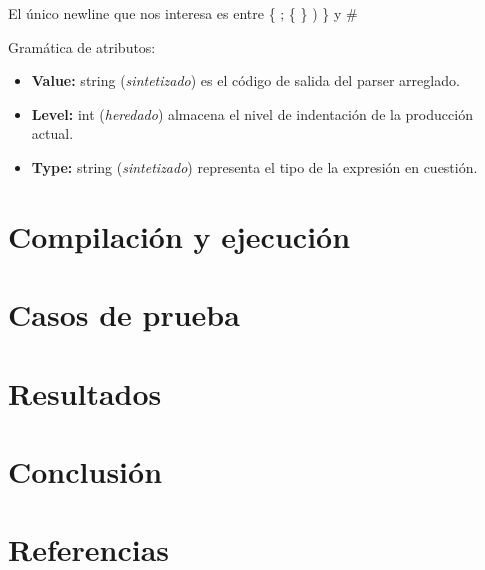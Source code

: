 \documentclass[10pt,a4paper]{article}
\begin{document}
El único newline que nos interesa es entre \{ ; \{ \} ) \} y \#

Gramática de atributos:

\begin{itemize}
\item \textbf{Value:} string (\textit{sintetizado}) es el código de salida del parser arreglado.
\item \textbf{Level:} int (\textit{heredado}) almacena el nivel de indentación de la producción actual.
\item \textbf{Type:} string (\textit{sintetizado}) representa el tipo de la expresión en cuestión.
\end{itemize}

\section{Compilación y ejecución}

\section{Casos de prueba}

\section{Resultados}

\section{Conclusión}

\section{Referencias}
\end{document}
